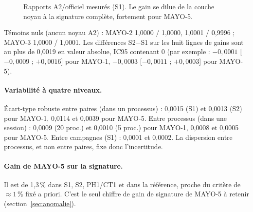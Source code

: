 \begin{figure}[ht]\centering
{}
\caption{Rapports A2/officiel mesurés (S1). Le gain se dilue de la couche noyau à la signature complète, fortement pour MAYO-5.}\label{fig:gains}
\end{figure}

\F{} Témoins nuls (aucun noyau A2) : MAYO-2  1,0000 / 1,0000,  1,0001 / 0,9996 ; MAYO-3  1,0000 / 1,0001. Les différences S2$-$S1 sur les huit lignes de gains sont au plus de 0,0019 en valeur absolue, IC95 contenant 0 (par exemple  : $-0{,}0001$ [$-0{,}0009$ ; $+0{,}0016$] pour MAYO-1, $-0{,}0003$ [$-0{,}0011$ ; $+0{,}0003$] pour MAYO-5).

\paragraph{Variabilité à quatre niveaux.} Écart-type robuste entre paires (dans un processus) : 0,0015 (S1) et 0,0013 (S2) pour MAYO-1, 0,0114 et 0,0039 pour MAYO-5. Entre processus (dans une session) : 0,0009 (20 proc.) et 0,0010 (5 proc.) pour MAYO-1, 0,0008 et 0,0005 pour MAYO-5. Entre campagnes (S1) : 0,0001 et 0,0002. La dispersion entre processus, et non entre paires, fixe donc l'incertitude.

\paragraph{Gain de MAYO-5 sur la signature.} \F{} Il est de 1,3\,\% dans S1, S2, PH1/CT1 et dans la référence, proche du critère de $\approx1$\,\% fixé a priori. C'est le seul chiffre de gain de signature de MAYO-5 à retenir (section~\ref{sec:anomalie}).


